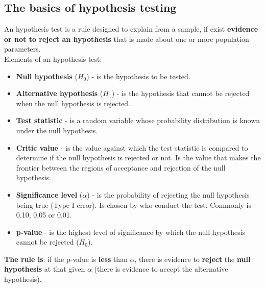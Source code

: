 \documentclass[10pt, a4paper, landscape]{extarticle}
\begin{document}
\begin{multicols}{3}
	\subsection*{The basics of hypothesis testing}
		An hypothesis test is a rule designed to explain from a sample, if exist \textbf{evidence or not to reject an hypothesis} that is made about one or more population parameters. \\
		Elements of an hypothesis test:
		\begin{itemize}[leftmargin=*]
			\item \textbf{Null hypothesis} ($H_0$) - is the hypothesis to be tested.
			\item \textbf{Alternative hypothesis} ($H_1$) - is the hypothesis that cannot be rejected when the null hypothesis is rejected.
			\item \textbf{Test statistic} - is a random variable whose probability distribution is known under the null hypothesis.
			\item \textbf{Critic value} - is the value against which the test statistic is compared to determine if the null hypothesis is rejected or not. Is the value that makes the frontier between the regions of acceptance and rejection of the null hypothesis.
			\item \textbf{Significance level} ($\alpha$) - is the probability of rejecting the null hypothesis being true (Type I error). Is chosen by who conduct the test. Commonly is 0.10, 0.05 or 0.01.
			\item \textbf{p-value} - is the highest level of significance by which the null hypothesis cannot be rejected ($H_0$).
		\end{itemize}
		\textbf{The rule is}: if the p-value is \textbf{less} than $\alpha$, there is evidence to \textbf{reject} the \textbf{null hypothesis} at that given $\alpha$ (there is evidence to accept the alternative hypothesis).

\end{multicols}
\end{document}
